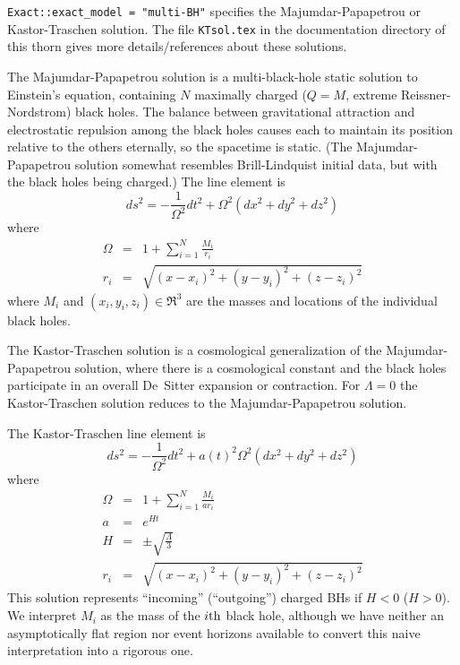 \verb|Exact::exact_model = "multi-BH"| specifies the Majumdar-Papapetrou
or Kastor-Traschen solution.  The file \verb|KTsol.tex| in the
documentation directory of this thorn gives more details/references
about these solutions.

The Majumdar-Papapetrou solution is a multi-black-hole static solution
to Einstein's equation, containing $N$ maximally charged ($Q=M$, \ie{}
extreme Reissner-Nordstrom) black holes.  The balance between
gravitational attraction and electrostatic repulsion among the
black holes causes each to maintain its position relative to the
others eternally, so the spacetime is static.  (The Majumdar-Papapetrou
solution somewhat resembles Brill-Lindquist initial data, but with the
black holes being charged.)  The line element is
\begin{equation}
ds^2=-\frac{1}{\Omega^2} dt^2+ \Omega^2(dx^2+dy^2+dz^2)
\end{equation}
where
\begin{eqnarray}
\Omega	&=& 1+\sum_{i=1}^N \frac{M_i}{r_i}				\\
r_i	&=& \sqrt{(x-x_i)^2+(y-y_i)^2+(z-z_i)^2}				%
\end{eqnarray}
where $M_i$ and $(x_i, y_i, z_i) \in \Re^3$ are the masses and
locations of the individual black holes.

The Kastor-Traschen solution is a cosmological generalization of the
Majumdar-Papapetrou solution, where there is a cosmological constant
and the black holes participate in an overall De~Sitter expansion or
contraction.  For $\Lambda = 0$ the Kastor-Traschen solution reduces
to the Majumdar-Papapetrou solution.

The Kastor-Traschen line element is
\begin{equation}
ds^2=-\frac{1}{\Omega^2} dt^2+a(t)^2 \Omega^2(dx^2+dy^2+dz^2)
\end{equation}
where
\begin{eqnarray}
\Omega	&=& 1+\sum_{i=1}^N {\frac{M_i}{a r_i}}				\\
a	&=& e^{Ht}							\\
H	&=& \pm \sqrt{\frac{\Lambda}{3}}				\\
r_i	&=& \sqrt{(x-x_i)^2 + (y-y_i)^2 + (z-z_i)^2}			%
\end{eqnarray}
This solution represents ``incoming'' (``outgoing'') charged BHs
if $H < 0$ ($H > 0$).  We interpret $M_i$ as the mass of the
$i{\rm th}$ black hole, although we have neither an asymptotically
flat region nor event horizons available to convert this naive
interpretation into a rigorous one.

